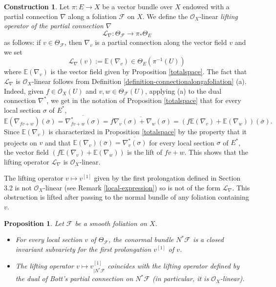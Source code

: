\documentclass[12pt]{amsart}
\theoremstyle{definition}
\newtheorem{construction}[definition]{Construction}
\theoremstyle{plain}
\newtheorem{proposition}[definition]{Proposition}
\theoremstyle{exampstyle}
\theoremstyle{exampstyle}\newtheorem{thmxbis}{Theorem}
\numberwithin{equation}{section}
\theoremstyle{remark}
\begin{document}
\begin{construction} 
Let $\pi: E \rightarrow X$ be a vector bundle over $X$ endowed with a partial connection $\nabla$ along a foliation $\mathcal F$ on $X$.  We define the $\mathcal O_X$-linear {\em{lifting operator of the partial connection $\nabla$}}
$$\mathcal L_\nabla : \Theta_\mathcal F \rightarrow \pi_\ast \Theta_E$$ as follows: if $v \in \Theta_\mathcal F$, then $\nabla_v$ is a partial connection along the vector field $v$ and we set 
$$\mathcal L_\nabla (v) := \mathbb{E}(\nabla_v) \in \Theta_E(\pi^{-1}(U))$$
where $\mathbb{E}(\nabla_v)$ is the vector field given by Proposition \ref{totalspace}.  The fact that $\mathcal L_\nabla$ is $\mathcal O_X$-linear follows from Definition \ref{definition-connectionalongafoliation} (a). Indeed, given $f \in \mathcal O_X(U)$ and $v,w \in \Theta_\mathcal F(U)$, applying (a) to the dual connection $\nabla^\ast$, we get in the notation of Proposition \ref{totalspace} that for every local section $\sigma$ of $E^\ast$,
$$\mathbb{E}(\nabla_{fv + w})(\overline{\sigma}) =  \overline{\nabla_{fv + w}^\ast (\sigma)} = \overline{f \nabla_v(\sigma) + \nabla_w(\sigma)} =  (f \mathbb{E}(\nabla_{v}) + \mathbb{E}(\nabla_{w})) (\overline{\sigma}).$$
Since $\mathbb{E}(\nabla_v)$ is characterized in Proposition \ref{totalspace} by the property that it projects on $v$ and that $\mathbb{E}(\nabla_v)(\overline{\sigma}) = \overline{\nabla_v^\ast (\sigma)}$ for every local section $\sigma$ of $E^\ast$, the vector field $(f \mathbb{E}(\nabla_{v}) + \mathbb{E}(\nabla_{w}))$ is the lift of $fv + w$. This shows that the lifting operator $\mathcal L_\nabla$ is $\mathcal O_X$-linear.

\end{construction} 

The lifting operator $v \mapsto v^{[1]}$ given by the first prolongation defined in Section 3.2 is not $\mathcal O_X$-linear (see Remark \ref{local-expression}) so is not of the form $\mathcal L_\nabla$. This obstruction is lifted after passing to the normal bundle of any foliation containing $v$. 



\begin{proposition} \label{proposition-comparaison-Bott}
Let $\mathcal F$ be a smooth foliation on $X$. 
\begin{itemize} 
\item[(i)] For every local section $v$ of $\Theta_\mathcal F$, the conormal bundle $N^\ast \mathcal F$ is a closed invariant subvariety for the first prolongation $v^{[1]}$ of $v$.
\item[(ii)] The lifting operator
 $v \mapsto v^{[1]}_{\mid N^\ast \mathcal F}$
coincides with the lifting operator defined by the dual of Bott's partial connection on $N^\ast \mathcal F$  (in particular, it is $\mathcal O_X$-linear).
\end{itemize} 
\end{proposition}
\end{document}
